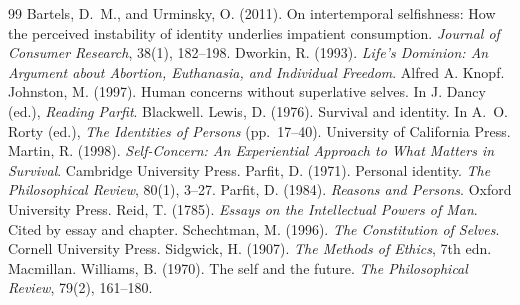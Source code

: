 \documentclass{situationist-preprint}
\begin{document}
\begin{thebibliography}{99}\small
{} Bartels, D.~M., and Urminsky, O. (2011). On intertemporal selfishness: How the perceived instability of identity underlies impatient consumption. \emph{Journal of Consumer Research}, 38(1), 182--198.
 Dworkin, R. (1993). \emph{Life's Dominion: An Argument about Abortion, Euthanasia, and Individual Freedom}. Alfred A. Knopf.
 Johnston, M. (1997). Human concerns without superlative selves. In J. Dancy (ed.), \emph{Reading Parfit}. Blackwell.
 Lewis, D. (1976). Survival and identity. In A.~O. Rorty (ed.), \emph{The Identities of Persons} (pp.~17--40). University of California Press.
 Martin, R. (1998). \emph{Self-Concern: An Experiential Approach to What Matters in Survival}. Cambridge University Press.
 Parfit, D. (1971). Personal identity. \emph{The Philosophical Review}, 80(1), 3--27.
 Parfit, D. (1984). \emph{Reasons and Persons}. Oxford University Press.
 Reid, T. (1785). \emph{Essays on the Intellectual Powers of Man}. Cited by essay and chapter.
 Schechtman, M. (1996). \emph{The Constitution of Selves}. Cornell University Press.
 Sidgwick, H. (1907). \emph{The Methods of Ethics}, 7th edn. Macmillan.
 Williams, B. (1970). The self and the future. \emph{The Philosophical Review}, 79(2), 161--180.
\end{thebibliography}
\end{document}
